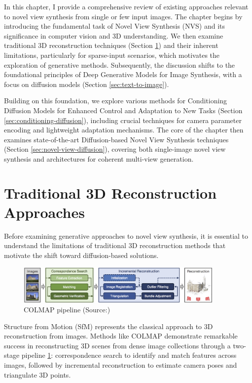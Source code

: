 \label{chapter:related}

In this chapter, I provide a comprehensive review of existing approaches relevant to novel view synthesis from single or few input images. The chapter begins by introducing the fundamental task of Novel View Synthesis (NVS) and its significance in computer vision and 3D understanding. We then examine traditional 3D reconstruction techniques (Section \ref{sec:3d-reconstruction}) and their inherent limitations, particularly for sparse-input scenarios, which motivates the exploration of generative methods. Subsequently, the discussion shifts to the foundational principles of Deep Generative Models for Image Synthesis, with a focus on diffusion models (Section \ref{sec:text-to-image}).

Building on this foundation, we explore various methods for Conditioning Diffusion Models for Enhanced Control and Adaptation to New Tasks (Section \ref{sec:conditioning-diffusion}), including crucial techniques for camera parameter encoding and lightweight adaptation mechanisms. The core of the chapter then examines state-of-the-art Diffusion-based Novel View Synthesis techniques (Section \ref{sec:novel-view-diffusion}), covering both single-image novel view synthesis and architectures for coherent multi-view generation.

\section{Traditional 3D Reconstruction Approaches}\label{sec:3d-reconstruction}

Before examining generative approaches to novel view synthesis, it is essential to understand the limitations of traditional 3D reconstruction methods that motivate the shift toward diffusion-based solutions.

\begin{figure}[h]
  \centering
  \includegraphics[width=0.9\textwidth]{images/related-work/COLMAP.png}
  \caption{COLMAP pipeline (Source:\cite{colmap_figure})}
  \label{fig:colmap-pipeline}
\end{figure}
Structure from Motion (SfM) represents the classical approach to 3D reconstruction from images. Methods like COLMAP \cite{colmap} demonstrate remarkable success in reconstructing 3D scenes from dense image collections through a two-stage pipeline \ref{fig:colmap-pipeline}: correspondence search to identify and match features across images, followed by incremental reconstruction to estimate camera poses and triangulate 3D points.

